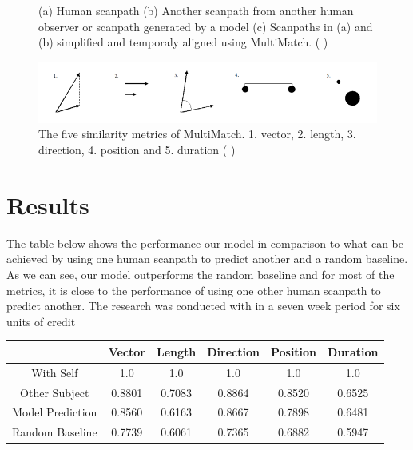 \documentclass{article} %
\begin{document}
\begin{figure}
\begin{subfigure}{.33\textwidth}
  \caption{}
  \label{fig:sfig23}
\end{subfigure}
\caption{(a) Human scanpath (b) Another scanpath from another human observer or scanpath generated by a model (c) Scanpaths in (a) and (b) simplified and temporaly aligned using MultiMatch. (\cite{Anderson2015} ) }
\label{fig:fig2}
\end{figure}

\begin{figure}[h]
    \centering
    \includegraphics[scale=0.5]{multimatch}
    \caption{The five similarity metrics of MultiMatch. 1. vector, 2. length, 3. direction, 4. position and 5. duration  (\cite{7ccdec072dc945c4a0138a73aedd0132} )}
    \label{fig:MultiMatch}
\end{figure}
\newpage
\section{Results}
The table below shows the performance our model in comparison to what can be achieved by using one human scanpath to predict another and a random baseline. As we can see, our model outperforms the random baseline and for most of the metrics, it is close to the performance of using one other human scanpath to predict another. The research was conducted with in a seven week period for six units of credit
\begin{center}
\begin{tabular}{ |c|c|c|c|c|c|} 
 \hline
  & Vector & Length & Direction & Position & Duration \\ 
  \hline
  With Self & 1.0 & 1.0 & 1.0 & 1.0 & 1.0\\
 \hline
 
 Other Subject &  0.8801 & 0.7083 & 0.8864 & 0.8520 & 0.6525\\ 
 \hline
 Model Prediction &0.8560&0.6163&0.8667& 0.7898& 0.6481\\
 \hline
 Random Baseline & 0.7739 & 0.6061 & 0.7365 & 0.6882 & 0.5947\\
 \hline
\end{tabular}
\end{center}
\end{document}
